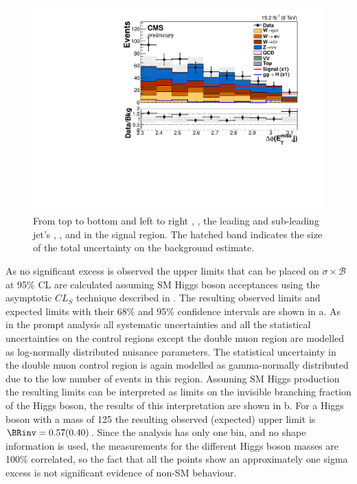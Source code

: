 \begin{figure}
    \includegraphics[width=.65\largefigwidth]{plots/parked/HIG-14-038-figs/output_sigreg/nunu_alljetsmetnomu_mindphi.pdf}

    \caption{From top to bottom and left to right \detajj, \Mjj, the leading and sub-leading jet's \pt, \METnoMU, \METsig and \jetmetdphi in the signal region. The hatched band indicates the size of the total uncertainty on the background estimate.}
   \label{fig:parkednunucontplots}
\end{figure}

As no significant excess is observed the upper limits that can be placed on $\sigma\times\mathcal{B}$ at 95\% \ac{CL} are calculated assuming \ac{SM} Higgs boson acceptances using the asymptotic $CL_{S}$ technique described in . The resulting observed limits and expected limits with their 68\% and 95\% confidence intervals are shown in a. As in the prompt analysis all systematic uncertainties and all the statistical uncertainties on the control regions except the double muon region are modelled as log-normally distributed nuisance parameters. The statistical uncertainty in the double muon control region is again modelled as gamma-normally distributed due to the low number of events in this region. Assuming \ac{SM} Higgs production the resulting limits can be interpreted as limits on the invisible branching fraction of the Higgs boson, the results of this interpretation are shown in b. For a Higgs boson with a mass of 125 \GeV the resulting observed (expected) upper limit is $\BRinv=0.57 (0.40)$. Since the analysis has only one bin, and no shape information is used, the measurements for the different Higgs boson masses are 100\% correlated, so the fact that all the points show an approximately one sigma excess is not significant evidence of non-\ac{SM} behaviour.

